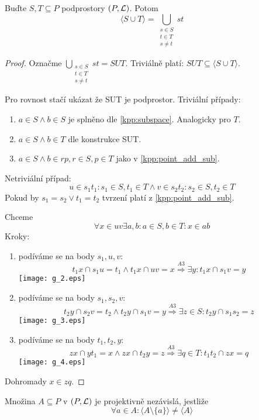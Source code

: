 \begin{lemma}
    Buďte $S,T \subseteq P$ podprostory $(P, \operatorname{\mathcal{L}})$.
    Potom
    \[ \langle S \cup T \rangle = \bigcup_{\substack{ s\in S \\ t\in T \\ s\neq t}} st \]
\end{lemma}
\begin{proof}
	Označme $\bigcup_{\substack{ s\in S \\ t\in T \\ s\neq t}} st = SUT$.
	Triviálně platí: $SUT \subseteq \langle S \cup T \rangle$.

	Pro rovnost stačí ukázat že SUT je podprostor.
	Triviální případy:
	\begin{enumerate}
		\item $a \in S \land b \in S$ je splněno dle \cref{kpp:subspace}.
			Analogicky pro $T$.
		\item $a \in S \land b \in T$ dle konstrukce SUT.
		\item $a \in S \land b \in rp, r \in S, p \in T$ jako v \cref{kpp:point_add_sub}.
	\end{enumerate}

	Netriviální případ:
	\[ u \in s_1t_1: s_1 \in S, t_1 \in T \land v \in s_2t_2: s_2 \in S, t_2 \in T \]
	Pokud by $s_1 = s_2 \lor t_1 = t_2$ tvrzení platí z \cref{kpp:point_add_sub}.

	Chceme
	\[ \forall x \in uv \exists a, b: a \in S, b \in T: x \in ab \]
	Kroky:
	\begin{enumerate}
		\item podíváme se na body $s_1, u, v$:
			\[ t_1x \cap s_1u = t_1 \land t_1x \cap uv = x \stackrel{A3}{\Rightarrow} \exists y: t_1x \cap s_1v = y \]
		\texttt{[image: g\_2.eps]}
	\item podíváme se na body $s_1, s_2, v$:
		\[ t_2y \cap s_2v = t_2 \land t_2y \cap s_1v = y \stackrel{A3}{\Rightarrow} \exists z \in S: t_2y \cap s_1s_2 = z \]
		\texttt{[image: g\_3.eps]}

	\item podíváme se na body $t_1, t_2, y$:
		\[ zx \cap yt_1 = x \land zx \cap t_2y = z \stackrel{A3}{\Rightarrow} \exists q \in T: t_1t_2 \cap zx = q \]
		\texttt{[image: g\_4.eps]}
	\end{enumerate}
	Dohromady $x \in zq$.
\end{proof}

\begin{definition}
    Množina $A\subseteq P$ v $(P,\operatorname{\mathcal{L}})$ je projektivně nezávislá, jestliže
    \[ \forall a\in A: \langle A\setminus \{a\}\rangle\neq\langle A \rangle \]
\end{definition}

